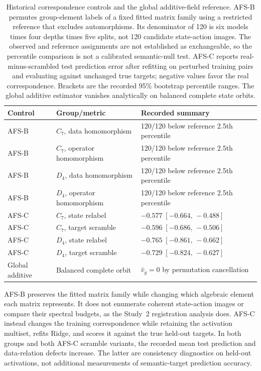 \begin{table}[t]
\caption{
Historical correspondence controls and the global
additive-field reference.
AFS-B permutes group-element labels of a fixed fitted
matrix family using a restricted reference that excludes
automorphisms.
Its denominator of 120 is six models times four depths
times five splits, not 120 candidate state-action images.
The observed and reference assignments are not established
as exchangeable, so the percentile comparison is not a
calibrated semantic-null test.
AFS-C reports real-minus-scrambled test prediction error
after refitting on perturbed training pairs and evaluating
against unchanged true targets; negative values favor
the real correspondence.
Brackets are the recorded 95\% bootstrap percentile ranges.
The global additive estimator vanishes analytically
on balanced complete state orbits.
}
\label{tab:diagnostic-controls}
\centering
\small
\begin{tabular}{llp{}}
\toprule
Control & Group/metric & Recorded summary \\
\midrule
AFS-B & $C_7$, data homomorphism
& 120/120 below reference 2.5th percentile \\
AFS-B & $C_7$, operator homomorphism
& 120/120 below reference 2.5th percentile \\
AFS-B & $D_4$, data homomorphism
& 120/120 below reference 2.5th percentile \\
AFS-B & $D_4$, operator homomorphism
& 120/120 below reference 2.5th percentile \\
AFS-C & $C_7$, state relabel
& $-0.577\;[-0.664,\,-0.488]$ \\
AFS-C & $C_7$, target scramble
& $-0.596\;[-0.686,\,-0.506]$ \\
AFS-C & $D_4$, state relabel
& $-0.765\;[-0.861,\,-0.662]$ \\
AFS-C & $D_4$, target scramble
& $-0.729\;[-0.824,\,-0.627]$ \\
\midrule
Global additive & Balanced complete orbit
& $\widehat v_g=0$ by permutation cancellation \\
\bottomrule
\end{tabular}
\end{table}

AFS-B preserves the fitted matrix family while changing
which algebraic element each matrix represents.
It does not enumerate coherent state-action images or
compare their spectral budgets, as the Study~2
registration analysis does.
AFS-C instead changes the training correspondence while
retaining the activation multiset, refits Ridge, and
scores it against the true held-out targets.
In both groups and both AFS-C scramble variants,
the recorded mean test prediction and data-relation
defects increase.
The latter are consistency diagnostics on held-out
activations, not additional measurements of semantic-target
prediction accuracy.


